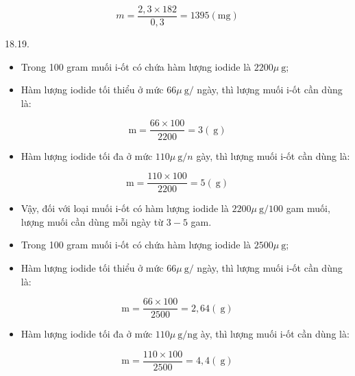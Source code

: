 \documentclass[10pt]{article}
\begin{document}
$$
m=\frac{2,3 \times 182}{0,3}=1395(\mathrm{mg})
$$

18.19.

\begin{itemize}
  \item Trong 100 gram muối i-ốt có chứa hàm lượng iodide là $2200 \mu \mathrm{~g}$;
\end{itemize}

\begin{itemize}
  \item Hàm lượng iodide tối thiểu ở mức $66 \mu \mathrm{~g} /$ ngày, thì lượng muối i-ốt cần dùng là:
\end{itemize}

$$
\mathrm{m}=\frac{66 \times 100}{2200}=3(\mathrm{~g})
$$

\begin{itemize}
  \item Hàm lượng iodide tối đa ở mức $110 \mu \mathrm{~g} / n$ gày, thì lượng muối i-ốt cần dùng là:
\end{itemize}

$$
\mathrm{m}=\frac{110 \times 100}{2200}=5(\mathrm{~g})
$$

\begin{itemize}
  \item Vậy, đối với loại muối i-ốt có hàm lượng iodide là $2200 \mu \mathrm{~g} / 100$ gam muối, lượng muối cần dùng mỗi ngày từ $3-5$ gam.
\end{itemize}

\begin{itemize}
  \item Trong 100 gram muối i-ốt có chứa hàm lượng iodide là $2500 \mu \mathrm{~g}$;
\end{itemize}

\begin{itemize}
  \item Hàm lượng iodide tối thiểu ở mức $66 \mu \mathrm{~g} /$ ngày, thì lượng muối i-ốt cần dùng là:
\end{itemize}

$$
\mathrm{m}=\frac{66 \times 100}{2500}=2,64(\mathrm{~g})
$$

\begin{itemize}
  \item Hàm lượng iodide tối đa ở mức $110 \mu \mathrm{~g} / \mathrm{ng}$ ày, thì lượng muối i-ốt cần dùng là:
\end{itemize}

$$
\mathrm{m}=\frac{110 \times 100}{2500}=4,4(\mathrm{~g})
$$
\end{document}
